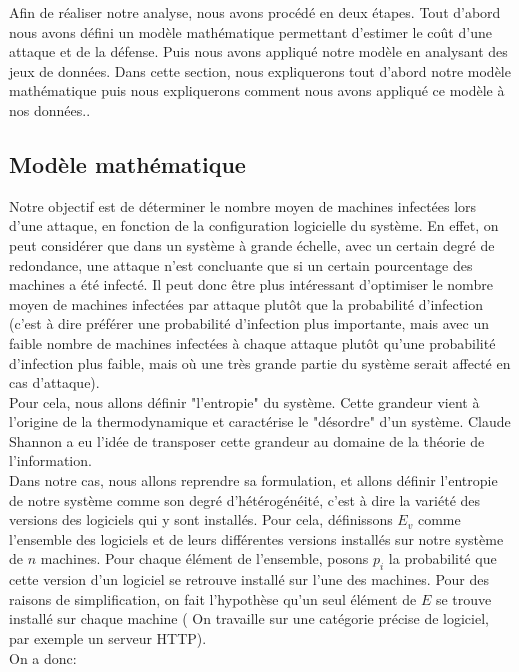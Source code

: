 
Afin de réaliser notre analyse, nous avons procédé en deux étapes.
Tout d'abord nous avons défini un modèle mathématique permettant d'estimer le coût d'une attaque et de la défense.
Puis nous avons appliqué notre modèle en analysant des jeux de données.
Dans cette section, nous expliquerons tout d'abord notre modèle mathématique puis nous expliquerons comment nous avons appliqué ce modèle à nos données..



\subsection{Modèle mathématique}\label{sec:modelMath}

Notre objectif est de déterminer le nombre moyen de machines infectées lors d'une attaque, en fonction de la configuration logicielle du système. En effet, on peut considérer que dans un système à grande échelle, avec un certain degré de redondance, une attaque n'est concluante que si un certain pourcentage des machines a été infecté. Il peut donc être plus intéressant d'optimiser le nombre moyen de machines infectées par attaque plutôt que la probabilité d'infection (c'est à dire préférer une probabilité d'infection plus importante, mais avec un faible nombre de machines infectées à chaque attaque plutôt qu'une probabilité d'infection plus faible, mais où une très grande partie du système serait affecté en cas d'attaque).\\
Pour cela, nous allons définir "l'entropie" du système. Cette grandeur vient à l'origine de la thermodynamique et caractérise le "désordre" d'un système. Claude Shannon a eu l'idée de transposer cette grandeur au domaine de la théorie de l'information\cite{entropie_shannon}.\\
Dans notre cas, nous allons reprendre sa formulation, et allons définir l'entropie de notre système comme son degré d'hétérogénéité, c'est à dire la variété des versions des logiciels qui y sont installés.
Pour cela, définissons $E_v$ comme l'ensemble des logiciels et de leurs différentes versions installés sur notre système de $n$ machines. Pour chaque élément de l'ensemble, posons $p_i$ la probabilité que cette version d'un logiciel se retrouve installé sur l'une des machines. Pour des raisons de simplification, on fait l'hypothèse qu'un seul élément de $E$ se trouve installé sur chaque machine ( On travaille sur une catégorie précise de logiciel, par exemple un serveur HTTP).\\
On a donc:

